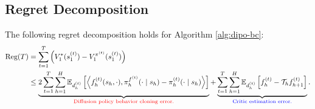 \subsection{Regret Decomposition}
\begin{lem}
    The following regret decomposition holds for Algorithm \ref{alg:dipo-bc}:
    \begin{align*}
        \text{Reg}(T) &= \sum_{t=1}^T\left(V_1^{*}(s_1^{(t)})-V_1^{\pi^{(t)}}(s_1^{(t)})\right) \\
        &\leq \underbrace{2\sum_{t=1}^T\sum_{h=1}^H \mathbb{E}_{d_h^{(t)}}\left[\left\langle f_h^{(t)}(s_h, \cdot), \pi_h^{f^{(t)}}(\cdot \mid s_h)-\pi_h^{(t)}(\cdot \mid s_h)\right\rangle\right]}_{\textcolor{red}{\text{Diffusion policy behavior cloning error.}}} + \underbrace{\sum_{t=1}^T \sum_{h=1}^H \mathbb{E}_{d_h^{(t)}}\left[f_h^{(t)}-{\mathcal{T}}_h f_{h+1}^{(t)}\right]}_{\textcolor{blue}{\text{Critic estimation error.}}} .
    \end{align*}
    \label{lem:regret-decomp-dipo}
\end{lem}
